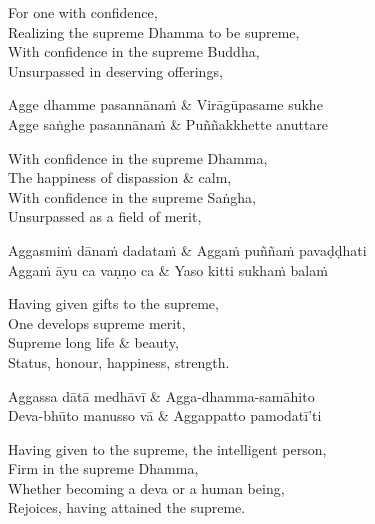 \begin{english}
  For one with confidence,\\
  Realizing the supreme Dhamma to be supreme,\\
  With confidence in the supreme Buddha,\\
  Unsurpassed in deserving offerings,
\end{english}

\begin{twochants}
  Agge dhamme pasannānaṁ & Virāgūpasame sukhe\\
  Agge saṅghe pasannānaṁ & Puññakkhette anuttare\\
\end{twochants}

\begin{english}
  With confidence in the supreme Dhamma,\\
  The happiness of dispassion \& calm,\\
  With confidence in the supreme Saṅgha,\\
  Unsurpassed as a field of merit,
\end{english}

\begin{twochants}
  Aggasmiṁ dānaṁ dadataṁ & Aggaṁ puññaṁ pavaḍḍhati\\
  Aggaṁ āyu ca vaṇṇo ca & Yaso kitti sukhaṁ balaṁ
\end{twochants}

\begin{english}
  Having given gifts to the supreme,\\
  One develops supreme merit,\\
  Supreme long life \& beauty,\\
  Status, honour, happiness, strength.
\end{english}

\begin{twochants}
  Aggassa dātā medhāvī & Agga-dhamma-samāhito\\
  Deva-bhūto manusso vā & Aggappatto pamodatī'ti
\end{twochants}

\begin{english}
  Having given to the supreme, the intelligent person,\\
  Firm in the supreme Dhamma,\\
  Whether becoming a deva or a human being,\\
  Rejoices, having attained the supreme.
\end{english}


